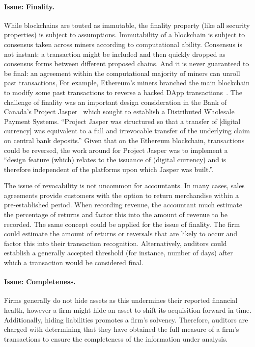 \paragraph{Issue: Finality.} While blockchains are touted as immutable, the finality property (like all security properties) is subject to assumptions. Immutability of a blockchain is subject to consensus taken across miners according to computational ability. Consensus is not instant: a transaction might be included and then quickly dropped as consensus forms between different proposed chains. And it is never guaranteed to be final: an agreement within the computational majority of miners can unroll past transactions, For example, Ethereum{'}s miners branched the main blockchain to modify some past transactions to reverse a hacked DApp transactions~\cite{dupont2017experiments}. The challenge of finality was an important design consideration in the Bank of Canada{'}s Project Jasper~\cite{chapman2017project} which sought to establish a Distributed Wholesale Payment Systems. ``Project Jasper was structured so that a transfer of [digital currency] was equivalent to a full and irrevocable transfer of the underlying claim on central bank deposits.'' Given that on the Ethereum blockchain, transactions could be reversed, the work around for Project Jasper was to implement a ``design feature (which) relates to the issuance of (digital currency) and is therefore independent of the platforms upon which Jasper was built.''.

The issue of revocability is not uncommon for accountants. In many cases, sales agreements provide customers with the option to return merchandise within a pre-established period. When recording revenue, the accountant much estimate the percentage of returns and factor this into the amount of revenue to be recorded. The same concept could be applied for the issue of finality. The firm could estimate the amount of returns or reversals that are likely to occur and factor this into their transaction recognition. Alternatively, auditors could establish a generally accepted threshold (for instance, number of days) after which a transaction would be considered final.  %

\paragraph{Issue: Completeness.} Firms generally do not hide assets as this undermines their reported financial health, however a firm might hide an asset to shift its acquisition forward in time. Additionally, hiding liabilities promotes a firm{'}s solvency. Therefore, auditors are charged with determining that they have obtained the full measure of a firm{'}s transactions to ensure the completeness of the information under analysis.

